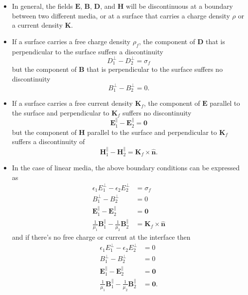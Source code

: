 \documentclass{article}
\renewcommand{\vec}[1]{\boldsymbol{\mathbf{#1}}}
\newcommand{\uvec}[1]{\hat{\vec{#1}}}
\begin{document}
\begin{itemize}
  \item In general, the fields $\vec{E}$, $\vec{B}$, $\vec{D}$, and $\vec{H}$ will be discontinuous at a boundary between two different media, or at a surface that carries a charge density $\rho$ or a current density $\vec{K}$.

  \item If a surface carries a free charge density $\rho_f$, the component of $\vec{D}$ that is perpendicular to the surface suffers a discontinuity \[D_1^\perp - D_2^\perp = \sigma_f\] but the component of $\vec{B}$ that is perpendicular to the surface suffers no discontinuity \[B_1^\perp - B_2^\perp = 0.\]

  \item If a surface carries a free current density $\vec{K}_f$, the component of $\vec{E}$ parallel to the surface and perpendicular to $\vec{K}_f$ suffers no discontinuity \[\vec{E}_1^\parallel - \vec{E}_2^\parallel = \vec{0}\] but the component of $\vec{H}$ parallel to the surface and perpendicular to $\vec{K}_f$ suffers a discontinuity of \[\vec{H}_1^\parallel - \vec{H}_2^\parallel = \vec{K}_f \times \uvec{n}.\]

  \item In the case of linear media, the above boundary conditions can be expressed as \begin{align*}
          \epsilon_1 E_1^\perp - \epsilon_2 E_2^\perp                               & = \sigma_f                  \\
          B_1^\perp - B_2^\perp                                                     & = 0                         \\
          \vec{E}_1^\parallel - \vec{E}_2^\parallel                                 & = \vec{0}                   \\
          \frac{1}{\mu_1} \vec{B}_1^\parallel - \frac{1}{\mu_2} \vec{B}_2^\parallel & = \vec{K}_f \times \uvec{n}
        \end{align*} and if there's no free charge or current at the interface then \begin{align*}
          \epsilon_1 E_1^\perp - \epsilon_2 E_2^\perp                               & = 0        \\
          B_1^\perp - B_2^\perp                                                     & = 0        \\
          \vec{E}_1^\parallel - \vec{E}_2^\parallel                                 & = \vec{0}  \\
          \frac{1}{\mu_1} \vec{B}_1^\parallel - \frac{1}{\mu_2} \vec{B}_2^\parallel & = \vec{0}.
        \end{align*}
\end{itemize}
\end{document}
